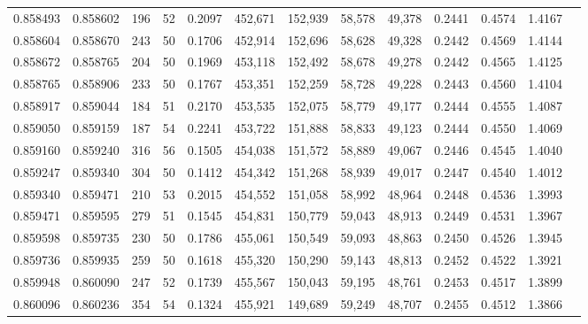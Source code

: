\begin{tabular}{rrrrrrrrrrrrr}
0.858493 & 0.858602 &   196 &  52 &                                     0.2097 & 452,671 & 152,939 &  58,578 &  49,378 & 0.2441 & 0.4574 & 1.4167 \\
0.858604 & 0.858670 &   243 &  50 &                                     0.1706 & 452,914 & 152,696 &  58,628 &  49,328 & 0.2442 & 0.4569 & 1.4144 \\
0.858672 & 0.858765 &   204 &  50 &                                     0.1969 & 453,118 & 152,492 &  58,678 &  49,278 & 0.2442 & 0.4565 & 1.4125 \\
0.858765 & 0.858906 &   233 &  50 &                                     0.1767 & 453,351 & 152,259 &  58,728 &  49,228 & 0.2443 & 0.4560 & 1.4104 \\
0.858917 & 0.859044 &   184 &  51 &                                     0.2170 & 453,535 & 152,075 &  58,779 &  49,177 & 0.2444 & 0.4555 & 1.4087 \\
0.859050 & 0.859159 &   187 &  54 &                                     0.2241 & 453,722 & 151,888 &  58,833 &  49,123 & 0.2444 & 0.4550 & 1.4069 \\
0.859160 & 0.859240 &   316 &  56 &                                     0.1505 & 454,038 & 151,572 &  58,889 &  49,067 & 0.2446 & 0.4545 & 1.4040 \\
0.859247 & 0.859340 &   304 &  50 &                                     0.1412 & 454,342 & 151,268 &  58,939 &  49,017 & 0.2447 & 0.4540 & 1.4012 \\
0.859340 & 0.859471 &   210 &  53 &                                     0.2015 & 454,552 & 151,058 &  58,992 &  48,964 & 0.2448 & 0.4536 & 1.3993 \\
0.859471 & 0.859595 &   279 &  51 &                                     0.1545 & 454,831 & 150,779 &  59,043 &  48,913 & 0.2449 & 0.4531 & 1.3967 \\
0.859598 & 0.859735 &   230 &  50 &                                     0.1786 & 455,061 & 150,549 &  59,093 &  48,863 & 0.2450 & 0.4526 & 1.3945 \\
0.859736 & 0.859935 &   259 &  50 &                                     0.1618 & 455,320 & 150,290 &  59,143 &  48,813 & 0.2452 & 0.4522 & 1.3921 \\
0.859948 & 0.860090 &   247 &  52 &                                     0.1739 & 455,567 & 150,043 &  59,195 &  48,761 & 0.2453 & 0.4517 & 1.3899 \\
0.860096 & 0.860236 &   354 &  54 &                                     0.1324 & 455,921 & 149,689 &  59,249 &  48,707 & 0.2455 & 0.4512 & 1.3866 \\

\end{tabular}
